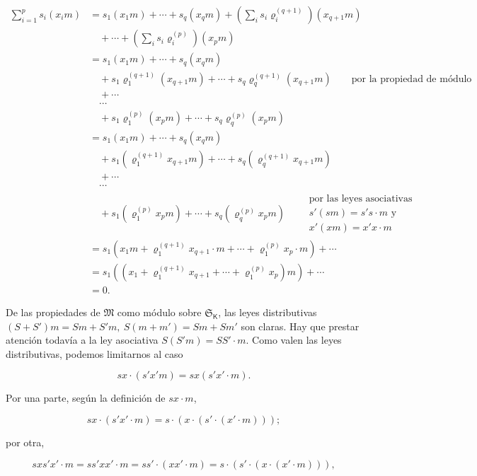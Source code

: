\[
\begin{aligned}
\sum_{i=1}^{p}s_i(x_i m)
&=s_1(x_1m)+\cdots+s_q(x_qm)
  +\left(\sum_i s_i\varrho_i^{(q+1)}\right)(x_{q+1}m)\\
&\quad+\cdots+\left(\sum_i s_i\varrho_i^{(p)}\right)(x_pm)\\
&=s_1(x_1m)+\cdots+s_q(x_qm)\\
&\quad+s_1\varrho_1^{(q+1)}(x_{q+1}m)+\cdots+s_q\varrho_q^{(q+1)}(x_{q+1}m)
  \qquad\text{por la propiedad de módulo}\\
&\quad+\cdots\\
&\quad\cdots\\
&\quad+s_1\varrho_1^{(p)}(x_pm)+\cdots+s_q\varrho_q^{(p)}(x_pm)\\
&=s_1(x_1m)+\cdots+s_q(x_qm)\\
&\quad+s_1(\varrho_1^{(q+1)}x_{q+1}m)+\cdots+s_q(\varrho_q^{(q+1)}x_{q+1}m)\\
&\quad+\cdots\\
&\quad\cdots\\
&\quad+s_1(\varrho_1^{(p)}x_pm)+\cdots+s_q(\varrho_q^{(p)}x_pm)
  \qquad\begin{gathered}\text{por las leyes asociativas }\\ s'(sm)=s's\cdot m\text{ y}\\ x'(xm)=x'x\cdot m\end{gathered}\\
&=s_1\left(x_1m+\varrho_1^{(q+1)}x_{q+1}\cdot m+\cdots+\varrho_1^{(p)}x_p\cdot m\right)+\cdots\\
&=s_1\left(\left(x_1+\varrho_1^{(q+1)}x_{q+1}+\cdots+\varrho_1^{(p)}x_p\right)m\right)+\cdots\\
&=0.
\end{aligned}
\]

De las propiedades de \(\mathfrak M\) como módulo sobre \(\mathfrak S_{\mathsf K}\), las leyes distributivas \((S+S')m=Sm+S'm,\ S(m+m')=Sm+Sm'\) son claras. Hay que prestar atención todavía a la ley asociativa \(S(S'm)=SS'\cdot m\). Como valen las leyes distributivas, podemos limitarnos al caso

\[
sx\cdot(s'x' m)=sx(s'x'\cdot m).
\]

Por una parte, según la definición de \(sx\cdot m\),

\[
sx\cdot(s'x'\cdot m)=s\cdot(x\cdot(s'\cdot(x'\cdot m)));
\]

por otra,

\[
sx s'x'\cdot m=ss'xx'\cdot m=ss'\cdot(xx'\cdot m)
=s\cdot(s'\cdot(x\cdot(x'\cdot m))),
\]

